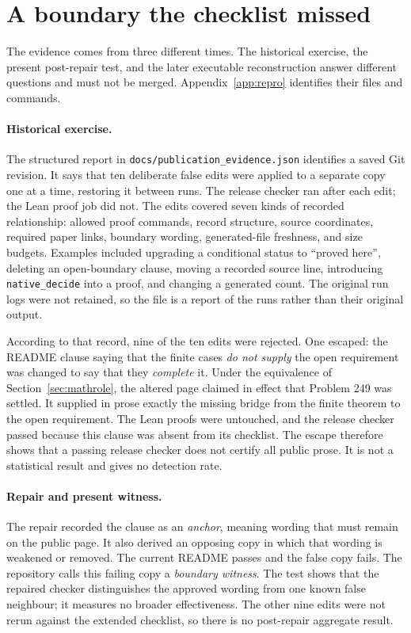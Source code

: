 \documentclass[11pt]{article}
\begin{document}
\pagebreak
\section{A boundary the checklist missed}\label{sec:failure}

The evidence comes from three different times.  The historical exercise, the
present post-repair test, and the later executable reconstruction answer
different questions and must not be merged.  Appendix~\ref{app:repro} identifies
their files and commands.

\paragraph{Historical exercise.}
The structured report in \texttt{docs/publication\_evidence.json} identifies a
saved Git revision.  It says that ten deliberate false edits were applied to a
separate copy one at a time, restoring it between runs.  The release checker
ran after each edit; the Lean proof job did not.  The edits covered seven kinds
of recorded relationship: allowed proof commands, record structure, source
coordinates, required paper links, boundary wording, generated-file freshness,
and size budgets.  Examples included
upgrading a conditional status to ``proved here'', deleting an open-boundary
clause, moving a recorded source line, introducing \texttt{native\_decide} into
a proof, and changing a generated count.  The original run logs were not retained,
so the file is a report of the runs rather than their original output.

According to that record, nine of the ten edits were rejected.  One escaped:
the README clause saying that the finite cases \emph{do not supply} the open
requirement was changed to say that they \emph{complete} it.  Under the
equivalence of Section~\ref{sec:mathrole}, the altered page claimed in effect
that Problem 249 was settled.  It supplied in prose exactly the missing bridge
from the finite theorem to the open requirement.  The Lean proofs were
untouched, and the release checker passed because this clause was absent from
its checklist.  The escape therefore shows that a passing release checker does
not certify all public prose.  It is not a statistical result
and gives no detection rate.

\paragraph{Repair and present witness.}
The repair recorded the clause as an \emph{anchor}, meaning wording that must
remain on the public page.  It also derived an opposing copy in which that
wording is weakened or removed.  The current README passes and the false copy
fails.  The repository calls this failing copy a \emph{boundary witness}.  The
test shows that the repaired checker distinguishes the approved wording from
one known false neighbour; it measures no broader effectiveness.  The other nine edits
were not rerun against the extended checklist, so there is no
post-repair aggregate result.
\end{document}

